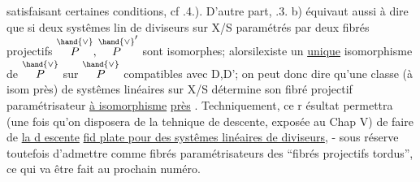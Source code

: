 
satisfaisant certaines conditions, cf .4.). D'autre part, .3. b)
équivaut  aussi à dire que  si deux systêmes lin de diviseurs
sur X/S  paramétrés par deux fibrés projectifs $\overset{\hand{\vee}}{P},\overset{\hand{\vee}}{P}'$ sont isomorphes;
alorsilexiste un \uline{unique} isomorphisme de $\overset{\hand{\vee}}{P}$ sur $\overset{\hand{\vee}}{P}$ compatibles avec D,D';
on peut donc dire qu'une classe (à isom près) de systêmes linéaires sur
X/S détermine son fibré projectif paramétrisateur \uline{à isomorphisme} 
\uline{près} . Techniquement, ce r ésultat permettra (une fois qu'on disposera
de la tehnique de descente, exposée au Chap V) de faire de \uline{la d escente}
\uline{fid plate pour des systêmes linéaires de diviseurs}, - sous réserve
 toutefois d'admettre  comme fibrés paramétrisateurs des ``fibrés projectifs
tordus'', ce qui va être fait au prochain  numéro.

